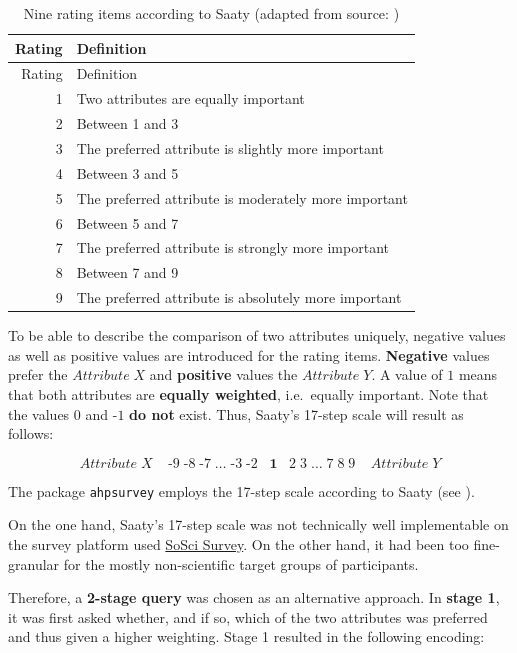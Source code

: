 \documentclass [oneside,10pt,a4paper,ngerman,BCOR10mm,headsepline,parindent,final]{scrartcl}
\begin{document}
\begin{longtable}[]{@{}rl@{}}
\caption{Nine rating items according to Saaty (adapted from source:
\cite{Vignettes_ahpsurvey_2019})}\tabularnewline
\toprule()
Rating & Definition \\
\midrule()
\endfirsthead
\toprule()
Rating & Definition \\
\midrule()
\endhead
1 & Two attributes are equally important \\
2 & Between 1 and 3 \\
3 & The preferred attribute is slightly more important \\
4 & Between 3 and 5 \\
5 & The preferred attribute is moderately more important \\
6 & Between 5 and 7 \\
7 & The preferred attribute is strongly more important \\
8 & Between 7 and 9 \\
9 & The preferred attribute is absolutely more important \\
\bottomrule()
\end{longtable}

To be able to describe the comparison of two attributes uniquely,
negative values as well as positive values are introduced for the rating
items. \textbf{Negative} values prefer the \(Attribute\;X\) and
\textbf{positive} values the \(Attribute\;Y\). A value of \textbf{\(1\)}
means that both attributes are \textbf{equally weighted}, i.e.~equally
important. Note that the values \(0\) and \(\text{-}1\) \textbf{do not}
exist. Thus, Saaty's 17-step scale will result as follows:

\[Attribute\;X\;\;\;\;\text{-}9\;\text{-}8\;\text{-}7\;\ldots\;\text{-}3\;\text{-}2\;\;\;\textbf{1}\;\;\;2\;3\;\ldots\;7\;8\;9\;\;\;\;Attribute\;Y\]

The package \texttt{ahpsurvey} employs the 17-step scale according to
Saaty (see \cite{Vignettes_ahpsurvey_2019}).

On the one hand, Saaty's 17-step scale was not technically well
implementable on the survey platform used
\href{https://www.soscisurvey.de/}{SoSci Survey}. On the other hand, it
had been too fine-granular for the mostly non-scientific target groups
of participants.

Therefore, a \textbf{2-stage query} was chosen as an alternative
approach. In \textbf{stage 1}, it was first asked whether, and if so,
which of the two attributes was preferred and thus given a higher
weighting. Stage 1 resulted in the following encoding:
\end{document}
